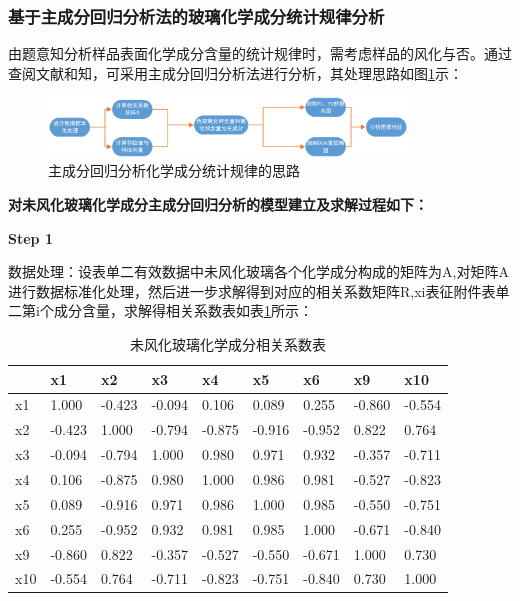 \documentclass{my_paper}
\begin{document}
\subsubsection{基于主成分回归分析法的玻璃化学成分统计规律分析}
由题意知分析样品表面化学成分含量的统计规律时，需考虑样品的风化与否。通过查阅文献\cite{崔剑锋2009湖南沅水流域战国时期楚墓出土古代玻璃器的成分分析}和\cite{温睿新疆巴里坤石人子沟遗址群出土玻璃珠的成分分析}知，可采用主成分回归分析法进行分析，其处理思路如图\ref{分析思路}示：
\begin{figure}[H]
    \centering
    \includegraphics[width=0.85\textwidth]{基于主成分分析的成分含量规律分析思路.jpg}
    \caption{主成分回归分析化学成分统计规律的思路}
    \label{分析思路}
\end{figure}
\textbf{对未风化玻璃化学成分主成分回归分析的模型建立及求解过程如下：}\par
\textbf{Step 1} \par
数据处理：设表单二有效数据中未风化玻璃各个化学成分构成的矩阵为A,对矩阵A进行数据标准化处理，然后进一步求解得到对应的相关系数矩阵R,xi表征附件表单二第i个成分含量，求解得相关系数表如表\ref{未风化玻璃化学成分相关系数表}所示：

\begin{table}[H]
    \centering
    \caption{未风化玻璃化学成分相关系数表}
    \label{未风化玻璃化学成分相关系数表}
    \begin{tabular}{lllllllll}
    \hline
         &x1 & x2 & x3 & x4 & x5 & x6 & x9 & x10 \\ \hline
        x1 & 1.000  & -0.423  & -0.094  & 0.106  & 0.089  & 0.255  & -0.860  & -0.554  \\ 
        x2 & -0.423  & 1.000  & -0.794  & -0.875  & -0.916  & -0.952  & 0.822  & 0.764  \\
        x3 & -0.094  & -0.794  & 1.000  & 0.980  & 0.971  & 0.932  & -0.357  & -0.711  \\ 
        x4 & 0.106  & -0.875  & 0.980  & 1.000  & 0.986  & 0.981  & -0.527  & -0.823  \\ 
        x5 & 0.089  & -0.916  & 0.971  & 0.986  & 1.000  & 0.985  & -0.550  & -0.751  \\ 
        x6 & 0.255  & -0.952  & 0.932  & 0.981  & 0.985  & 1.000  & -0.671  & -0.840  \\ 
        x9 & -0.860  & 0.822  & -0.357  & -0.527  & -0.550  & -0.671  & 1.000  & 0.730  \\ 
        x10 & -0.554  & 0.764  & -0.711  & -0.823  & -0.751  & -0.840  & 0.730  & 1.000 \\  \hline
    \end{tabular}
\end{table}
\end{document}

